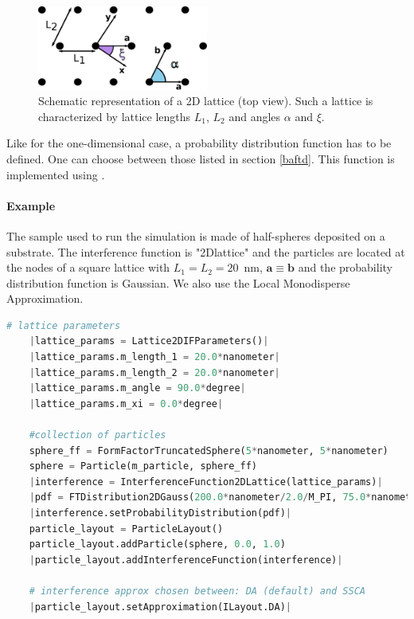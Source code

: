 \begin{figure}[h]
\begin{center}
\includegraphics[width=0.5\textwidth]{Figures/2Dlattice.eps}
\end{center}
\caption{Schematic representation of a 2D lattice (top view). Such a lattice is characterized by lattice lengths $L_1$, $L_2$ and angles $\alpha$ and $\xi$.}
\label{fig:2dlattice}
\end{figure}

Like for the one-dimensional case, a probability distribution function  has to be defined. One can choose between those listed in section \ref{baftd}. This function is implemented using .%

\paragraph{Example} The sample used to run the simulation is made of half-spheres deposited on a substrate. The interference function is "2Dlattice" and the particles are located at the nodes of a square lattice with $L_1=L_2=20$~nm, $\mathbf{a}\equiv \mathbf{b}$ and the probability distribution function is Gaussian. We also use the Local Monodisperse Approximation. 

\begin{lstlisting}[language=python, style=eclipseboxed,numbers=none,nolol,caption={\Code{Python} script to define a 2DLattice interference function between hemi-spherical particles as well as the Decoupling Approximation in \Code{getSimulation()}.  The part specific to the interferences is marked in red italic font.},label={lst:2dlatticeinterf}]
    # lattice parameters
    |lattice_params = Lattice2DIFParameters()|
    |lattice_params.m_length_1 = 20.0*nanometer|
    |lattice_params.m_length_2 = 20.0*nanometer|
    |lattice_params.m_angle = 90.0*degree|
    |lattice_params.m_xi = 0.0*degree|

    #collection of particles
    sphere_ff = FormFactorTruncatedSphere(5*nanometer, 5*nanometer)
    sphere = Particle(m_particle, sphere_ff)
    |interference = InterferenceFunction2DLattice(lattice_params)|
    |pdf = FTDistribution2DGauss(200.0*nanometer/2.0/M_PI, 75.0*nanometer/2.0/M_PI)|
    |interference.setProbabilityDistribution(pdf)|
    particle_layout = ParticleLayout()
    particle_layout.addParticle(sphere, 0.0, 1.0)
    |particle_layout.addInterferenceFunction(interference)|

    # interference approx chosen between: DA (default) and SSCA
    |particle_layout.setApproximation(ILayout.DA)|
\end{lstlisting}
 
